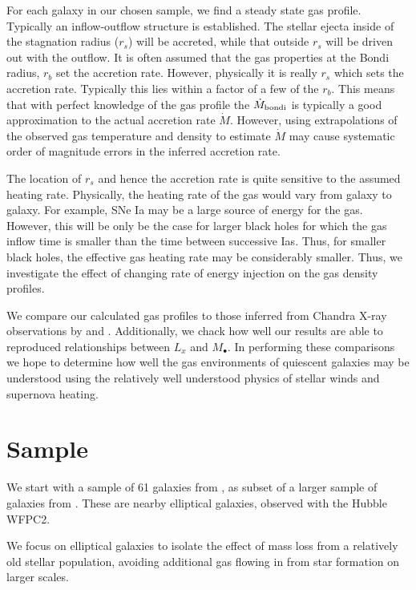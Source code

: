 \documentclass[usenatbib,fleqn]{mn2e}
\newcommand{\Mdot}{\dot{M}}
\newcommand{\Mdotb}{\dot{M}_{\rm bondi}}
\newcommand{\rs}{r_s}
\newcommand{\rb}{r_b}
\newcommand{\Mbh}[1][]{M_{\bullet#1}}
\begin{document}
For each galaxy in our chosen sample, we find a steady state gas
profile. Typically an inflow-outflow structure is established. The
stellar ejecta inside of the stagnation radius ($\rs$) will be
accreted, while that outside $\rs$ will be driven out with the
outflow.  It is often assumed that the gas properties at the Bondi
radius, $\rb$ set the accretion rate. However, physically it is really
$\rs$ which sets the accretion rate. Typically this lies within a
factor of a few of the $\rb$.  This means that with perfect knowledge
of the gas profile the $\Mdotb$ is typically a good approximation to
the actual accretion rate $\Mdot$.  However, using extrapolations of
the observed gas temperature and density to estimate $\Mdot$ may cause
systematic order of magnitude errors in the inferred accretion rate.

The location of $\rs$ and hence the accretion rate is quite sensitive
to the assumed heating rate.  Physically, the heating rate of the gas
would vary from galaxy to galaxy. For example, SNe Ia may be a large
source of energy for the gas. However, this will be only be the case
for larger black holes for which the gas inflow time is smaller than
the time between successive Ias. Thus, for smaller black holes, the
effective gas heating rate may be considerably smaller. Thus, we
investigate the effect of changing rate of energy injection on the gas
density profiles.

We compare our calculated gas profiles to those inferred from Chandra
X-ray observations by \citealt{AllenDunn+:2006a} and
\citealt{RussellMcNamara+:2013a}. Additionally, we chack how well our
results are able to reproduced relationships between $L_x$ and
$\Mbh$. In performing these comparisons we hope to determine how well
the gas environments of quiescent galaxies may be understood using the
relatively well understood physics of stellar winds and supernova
heating.


\section{Sample}
We start with a sample of 61 galaxies from
, as subset of a larger sample of
galaxies from \citealt{FaberTremaine+:1997a}. These are nearby
elliptical galaxies, observed with the Hubble WFPC2.

We focus on elliptical galaxies to isolate the effect of mass loss
from a relatively old stellar population, avoiding additional gas
flowing in from star formation on larger scales.
\end{document}
